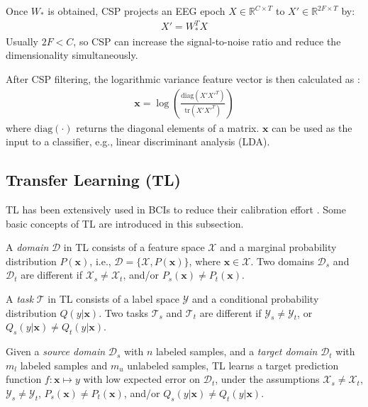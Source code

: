 \documentclass[runningheads]{llncs}
\begin{document}
Once $W_{\ast}$ is obtained, CSP projects an EEG epoch $X\in \mathbb{R}^{C\times T}$ to $X'\in \mathbb{R}^{2F\times T}$ by:
\begin{align}
 X'=W_{\ast}^TX \label{eq:X'}
\end{align}
Usually $2F<C$, so CSP can increase the signal-to-noise ratio and reduce the dimensionality simultaneously.

After CSP filtering, the logarithmic variance feature vector is then calculated as \cite{Dalhoumi2014}:
\begin{align}
\mathbf{x}=\log\left(\frac{\mathrm{diag}(X'X'^T)}{\mathrm{tr}(X'X'^T)}\right) \label{eq:x}
\end{align}
where $\mathrm{diag}(\cdot)$ returns the diagonal elements of a matrix. $\mathbf{x}$ can be used as the input to a classifier, e.g., linear discriminant analysis (LDA).

\subsection{Transfer Learning (TL)}

TL has been extensively used in BCIs to reduce their calibration effort \cite{Jayaram2016,Waytowich2016,drwuTHMS2017,drwuTFS2016,drwuTNSRE2016}. Some basic concepts of TL are introduced in this subsection.

A \emph{domain} \cite{Pan2010,Long2014} $\mathcal{D}$ in TL consists of a feature space $\mathcal{X}$ and a marginal probability distribution $P(\mathbf{x})$, i.e., $\mathcal{D}=\{\mathcal{X},P(\mathbf{x})\}$, where $\mathbf{x}\in \mathcal{X}$. Two domains $\mathcal{D}_s$ and $\mathcal{D}_t$ are different if $\mathcal{X}_s\neq \mathcal{X}_t$, and/or $P_s(\mathbf{x})\neq P_t(\mathbf{x})$.

A \emph{task} \cite{Pan2010,Long2014} $\mathcal{T}$ in TL consists of a label space $\mathcal{Y}$ and a conditional probability distribution $Q(y|\mathbf{x})$. Two tasks $\mathcal{T}_s$ and $\mathcal{T}_t$ are different if $\mathcal{Y}_s\neq \mathcal{Y}_t$, or $Q_s(y|\mathbf{x})\neq Q_t(y|\mathbf{x})$.

Given a \emph{source domain} $\mathcal{D}_s$ with $n$ labeled samples, and a \emph{target domain} $\mathcal{D}_t$ with $m_l$ labeled samples and $m_u$ unlabeled samples, TL learns a target prediction function $f: \mathbf{x} \mapsto y$ with low expected error on $\mathcal{D}_t$, under the assumptions $\mathcal{X}_s\neq\mathcal{X}_t$, $\mathcal{Y}_s\neq\mathcal{Y}_t$, $P_s(\mathbf{x})\neq P_t(\mathbf{x})$, and/or $Q_s(y|\mathbf{x})\neq Q_t(y|\mathbf{x})$.
\end{document}
